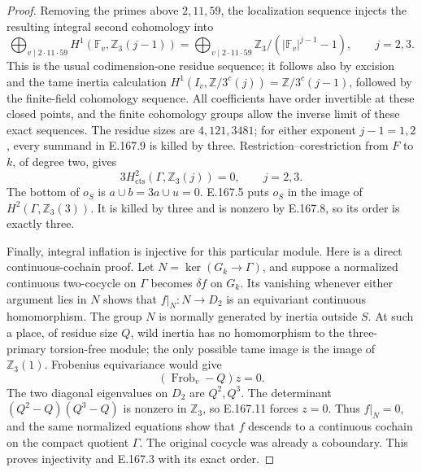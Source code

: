 \begin{proof}
Removing the primes above \(2,11,59\), the localization sequence
injects the resulting integral second cohomology into
\[
 \bigoplus_{v\mid2\cdot11\cdot59}
 H^1(\mathbb F_v,\mathbb Z_3(j-1))
 =\bigoplus_{v\mid2\cdot11\cdot59}
       \mathbb Z_3/(|\mathbb F_v|^{j-1}-1),\qquad j=2,3.
\tag{E.167.9}
\]
This is the usual codimension-one residue sequence; it follows
also by excision and the tame inertia calculation
\(H^1(I_v,\mathbb Z/3^c(j))=\mathbb Z/3^c(j-1)\), followed by the finite-field
cohomology sequence.  All coefficients have order invertible at
these closed points, and the finite cohomology groups allow the
inverse limit of these exact sequences.  The residue sizes are
\(4,121,3481\); for either exponent \(j-1=1,2\), every summand
in E.167.9 is killed by three.  Restriction--corestriction from
\(F\) to \(k\), of degree two, gives
\[
       3H^2_{\mathrm{cts}}(\Gamma,\mathbb Z_3(j))=0,
                         \qquad j=2,3.
\tag{E.167.10}
\]
The bottom of \(o_S\) is \(a\cup b=3a\cup u=0\).
E.167.5 puts \(o_S\) in the image of
\(H^2(\Gamma,\mathbb Z_3(3))\).  It is killed by three and is
nonzero by E.167.8, so its order is exactly three.

Finally, integral inflation is injective for this particular
module.  Here is a direct continuous-cochain proof.  Let
\(N=\ker(G_k\to\Gamma)\), and suppose a normalized continuous
two-cocycle on \(\Gamma\) becomes \(\delta f\) on \(G_k\).
Its vanishing whenever either argument lies in \(N\) shows that
\(f|_N:N\to D_2\) is an equivariant continuous homomorphism.
The group \(N\) is normally generated by inertia outside \(S\).
At such a place, of residue size \(Q\), wild inertia has no
homomorphism to the three-primary torsion-free module; the only
possible tame image is the image of \(\mathbb Z_3(1)\).
Frobenius equivariance would give
\[
                    (\operatorname{Frob}_v-Q)z=0.
\tag{E.167.11}
\]
The two diagonal eigenvalues on \(D_2\) are \(Q^2,Q^3\).
The determinant \((Q^2-Q)(Q^3-Q)\) is nonzero in \(\mathbb Z_3\),
so E.167.11 forces \(z=0\).  Thus \(f|_N=0\), and the same
normalized equations show that \(f\) descends to a continuous
cochain on the compact quotient \(\Gamma\).  The original
cocycle was already a coboundary.  This proves injectivity and
E.167.3 with its exact order.
\end{proof}

